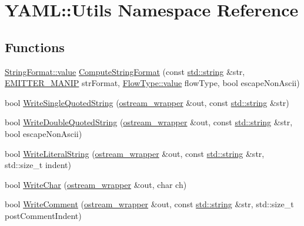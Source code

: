 \hypertarget{namespace_y_a_m_l_1_1_utils}{}\section{Y\+A\+ML\+::Utils Namespace Reference}
\label{namespace_y_a_m_l_1_1_utils}
\subsection*{Functions}
\begin{DoxyCompactItemize}
\item 
\mbox{\hyperlink{struct_y_a_m_l_1_1_string_format_aa87d77d0f60417355a95432f16b226e0}{String\+Format\+::value}} \mbox{\hyperlink{namespace_y_a_m_l_1_1_utils_a5e90407fae0bc69c37ab45c2c5ef1b75}{Compute\+String\+Format}} (const \mbox{\hyperlink{glad_8h_ac83513893df92266f79a515488701770}{std\+::string}} \&str, \mbox{\hyperlink{namespace_y_a_m_l_a67c320aa50d3de7ecba1d0b8775dd684}{E\+M\+I\+T\+T\+E\+R\+\_\+\+M\+A\+N\+IP}} str\+Format, \mbox{\hyperlink{struct_y_a_m_l_1_1_flow_type_afc7b0fab097e599c9b49918739e1b5cc}{Flow\+Type\+::value}} flow\+Type, bool escape\+Non\+Ascii)
\item 
bool \mbox{\hyperlink{namespace_y_a_m_l_1_1_utils_a891448c41049715579789fd852895422}{Write\+Single\+Quoted\+String}} (\mbox{\hyperlink{class_y_a_m_l_1_1ostream__wrapper}{ostream\+\_\+wrapper}} \&out, const \mbox{\hyperlink{glad_8h_ac83513893df92266f79a515488701770}{std\+::string}} \&str)
\item 
bool \mbox{\hyperlink{namespace_y_a_m_l_1_1_utils_afeb4d005f93fc2d51d02cd4d658ed356}{Write\+Double\+Quoted\+String}} (\mbox{\hyperlink{class_y_a_m_l_1_1ostream__wrapper}{ostream\+\_\+wrapper}} \&out, const \mbox{\hyperlink{glad_8h_ac83513893df92266f79a515488701770}{std\+::string}} \&str, bool escape\+Non\+Ascii)
\item 
bool \mbox{\hyperlink{namespace_y_a_m_l_1_1_utils_aeb118a00a60fa8cbbe613f787d8d2043}{Write\+Literal\+String}} (\mbox{\hyperlink{class_y_a_m_l_1_1ostream__wrapper}{ostream\+\_\+wrapper}} \&out, const \mbox{\hyperlink{glad_8h_ac83513893df92266f79a515488701770}{std\+::string}} \&str, std\+::size\+\_\+t indent)
\item 
bool \mbox{\hyperlink{namespace_y_a_m_l_1_1_utils_a7ddff3f9bbcb646955d41bde78cf1d6d}{Write\+Char}} (\mbox{\hyperlink{class_y_a_m_l_1_1ostream__wrapper}{ostream\+\_\+wrapper}} \&out, char ch)
\item 
bool \mbox{\hyperlink{namespace_y_a_m_l_1_1_utils_a83f522e522e5ca04f5618a03d1e49795}{Write\+Comment}} (\mbox{\hyperlink{class_y_a_m_l_1_1ostream__wrapper}{ostream\+\_\+wrapper}} \&out, const \mbox{\hyperlink{glad_8h_ac83513893df92266f79a515488701770}{std\+::string}} \&str, std\+::size\+\_\+t post\+Comment\+Indent)

\end{DoxyCompactItemize}
